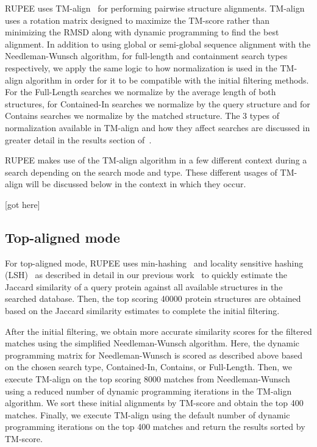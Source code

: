 \documentclass[10pt,letterpaper]{article}
\begin{document}
RUPEE uses TM-align~\cite{Zhang2005} for performing pairwise structure alignments.
TM-align uses a rotation matrix designed to maximize the TM-score rather than minimizing the RMSD along with dynamic programming to find the best alignment. 
In addition to using global or semi-global sequence alignment with the Needleman-Wunsch algorithm, for full-length and containment search types respectively, we apply the same logic to how normalization is used in the TM-align algorithm in order for it to be compatible with the initial filtering methods.
For the Full-Length searches we normalize by the average length of both structures, for Contained-In searches we normalize by the query structure and for Contains searches we normalize by the matched structure.
The 3 types of normalization available in TM-align and how they affect searches are discussed in greater detail in the results section of~\cite{Ayoub2019}.

RUPEE makes use of the TM-align algorithm in a few different context during a search depending on the search mode and type. 
These different usages of TM-align will be discussed below in the context in which they occur. 

[got here]

\subsection*{Top-aligned mode}

For top-aligned mode, RUPEE uses min-hashing~\cite{Broder1998} and locality sensitive hashing (LSH)~\cite{Indyk1998} as described in detail in our previous work~\cite{Ayoub2019} to quickly estimate the Jaccard similarity of a query protein against all available structures in the searched database.  
Then, the top scoring 40000 protein structures are obtained based on the Jaccard similarity estimates to complete the initial filtering. 

After the initial filtering, we obtain more accurate similarity scores for the filtered matches using the simplified Needleman-Wunsch algorithm. 
Here, the dynamic programming matrix for Needleman-Wunsch is scored as described above based on the chosen search type, Contained-In, Contains, or Full-Length. 
Then, we execute TM-align on the top scoring 8000 matches from Needleman-Wunsch using a reduced number of dynamic programming iterations in the TM-align algorithm. 
We sort these initial alignments by TM-score and obtain the top 400 matches.
Finally, we execute TM-align using the default number of dynamic programming iterations on the top 400 matches and return the results sorted by TM-score. 
\end{document}
